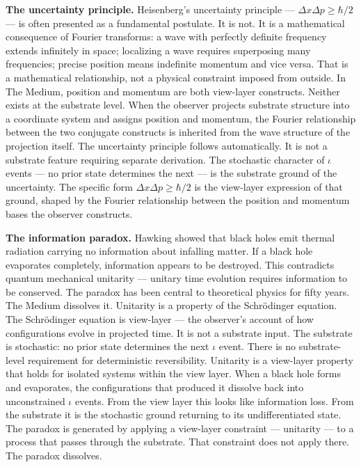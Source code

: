 \documentclass[11pt,letterpaper]{article}
\begin{document}
\textbf{The uncertainty principle.} Heisenberg's uncertainty principle --- \(\Delta x \Delta p \geq \hbar/2\) --- is often presented as a fundamental postulate. It is not. It is a mathematical consequence of Fourier transforms: a wave with perfectly definite frequency extends infinitely in space; localizing a wave requires superposing many frequencies; precise position means indefinite momentum and vice versa. That is a mathematical relationship, not a physical constraint imposed from outside. In The Medium, position and momentum are both view-layer constructs. Neither exists at the substrate level. When the observer projects substrate structure into a coordinate system and assigns position and momentum, the Fourier relationship between the two conjugate constructs is inherited from the wave structure of the projection itself. The uncertainty principle follows automatically. It is not a substrate feature requiring separate derivation. The stochastic character of \(\iota\) events --- no prior state determines the next --- is the substrate ground of the uncertainty. The specific form \(\Delta x \Delta p \geq \hbar/2\) is the view-layer expression of that ground, shaped by the Fourier relationship between the position and momentum bases the observer constructs.

\textbf{The information paradox.} Hawking showed that black holes emit thermal radiation carrying no information about infalling matter. If a black hole evaporates completely, information appears to be destroyed. This contradicts quantum mechanical unitarity --- unitary time evolution requires information to be conserved. The paradox has been central to theoretical physics for fifty years. The Medium dissolves it. Unitarity is a property of the Schrödinger equation. The Schrödinger equation is view-layer --- the observer's account of how configurations evolve in projected time. It is not a substrate input. The substrate is stochastic: no prior state determines the next \(\iota\) event. There is no substrate-level requirement for deterministic reversibility. Unitarity is a view-layer property that holds for isolated systems within the view layer. When a black hole forms and evaporates, the configurations that produced it dissolve back into unconstrained \(\iota\) events. From the view layer this looks like information loss. From the substrate it is the stochastic ground returning to its undifferentiated state. The paradox is generated by applying a view-layer constraint --- unitarity --- to a process that passes through the substrate. That constraint does not apply there. The paradox dissolves.
\end{document}
